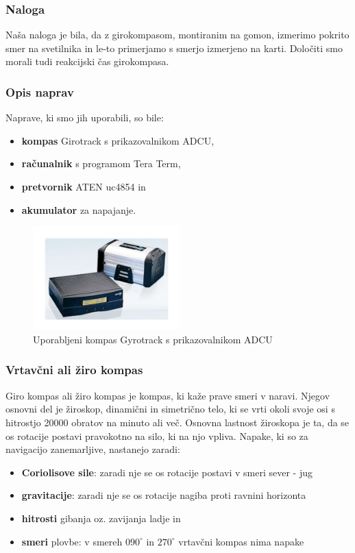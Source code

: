 \subsubsection{Naloga}
Naša naloga je bila, da z girokompasom, montiranim na gomon, izmerimo pokrito smer na svetilnika in le-to primerjamo s smerjo izmerjeno na karti. Določiti smo morali tudi reakcijski čas girokompasa.

\subsubsection{Opis naprav}
Naprave, ki smo jih uporabili, so bile:
\begin{itemize}
	\item \textbf{kompas} Girotrack s prikazovalnikom ADCU, 
	\item \textbf{računalnik} s programom Tera Term, 
	\item \textbf{pretvornik} ATEN uc4854 in 
	\item \textbf{akumulator} za napajanje.
\end{itemize}  

\begin{figure}
	\centering
	\includegraphics[height=4cm]{Vaje/VzorecPoroc/figs/Gyrotrac_slika.pdf}
	\caption{Uporabljeni kompas Gyrotrack s prikazovalnikom ADCU}
	\label{fig:GT}       %
\end{figure}

\subsubsection{Vrtavčni ali žiro kompas}
Giro kompas ali žiro kompas je kompas, ki kaže prave smeri v naravi. Njegov osnovni del je žiroskop, dinamični in simetrično telo, ki se vrti okoli svoje osi s hitrostjo 20000 obratov na minuto ali več. Osnovna lastnost žiroskopa je ta, da se os rotacije postavi pravokotno na silo, ki na njo vpliva. Napake, ki so za navigacijo zanemarljive, nastanejo zaradi:
\begin{itemize}
	\item \textbf{Coriolisove sile}: zaradi nje se os rotacije postavi v smeri sever - jug
	\item \textbf{gravitacije}: zaradi nje se os rotacije nagiba proti ravnini horizonta
	\item \textbf{hitrosti} gibanja oz. zavijanja ladje in
	\item \textbf{smeri} plovbe: v smereh $090^{\circ}$ in $270^{\circ}$ vrtavčni kompas nima napake
\end{itemize}


